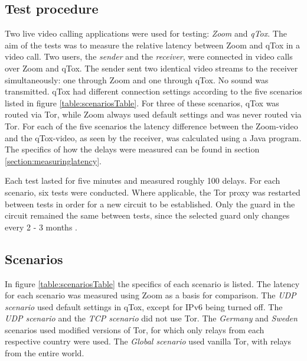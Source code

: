 \documentclass{kththesis}
\begin{document}
\subsection{Test procedure}
Two live video calling applications were used for testing: \emph{Zoom} and \emph{qTox}. The aim of the tests was to measure the relative latency between Zoom and qTox in a video call. Two users, the \emph{sender} and the \emph{receiver}, were connected in video calls over Zoom and qTox. The sender sent two identical video streams to the receiver simultaneously: one through Zoom and one through qTox. No sound was transmitted. qTox had different connection settings according to the five scenarios listed in figure \ref{table:scenariosTable}. For three of these scenarios, qTox was routed via Tor, while Zoom always used default settings and was never routed via Tor. For each of the five scenarios the latency difference between the Zoom-video and the qTox-video, as seen by the receiver, was calculated using a Java program. The specifics of how the delays were measured can be found in section \ref{section:measuringlatency}.

Each test lasted for five minutes and measured roughly 100 delays. For each scenario, six tests were conducted. Where applicable, the Tor proxy was restarted between tests in order for a new circuit to be established. Only the guard in the circuit remained the same between tests, since the selected guard only changes every 2 - 3 months \parencite{TorGuard}.

\subsection{Scenarios}
In figure \ref{table:scenariosTable} the specifics of each scenario is listed. The latency for each scenario was measured using Zoom as a basis for comparison. The \emph{UDP scenario} used default settings in qTox, except for IPv6 being turned off. The \emph{UDP scenario} and the \emph{TCP scenario} did not use Tor. The \emph{Germany} and \emph{Sweden} scenarios used modified versions of Tor, for which only relays from each respective country were used. The \emph{Global scenario} used vanilla Tor, with relays from the entire world.
\end{document}
